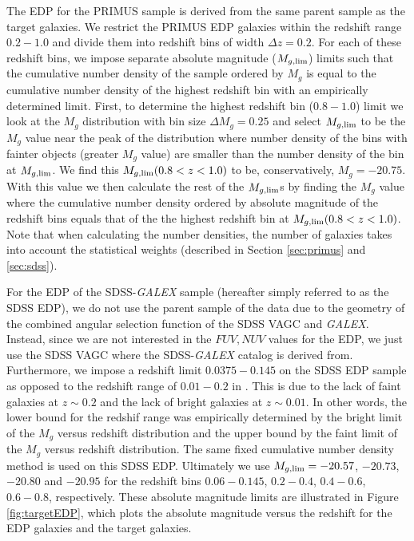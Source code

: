 \documentclass{emulateapj}
\begin{document}
The EDP for the PRIMUS sample is derived from the same parent sample as the target galaxies. 
We restrict the PRIMUS EDP galaxies within the redshift range $0.2-1.0$ and divide them into redshift bins of width $\Delta z = 0.2$. 
For each of these redshift bins, we impose separate absolute magnitude ($M_{g,\rm{lim}}$) limits such 
that the cumulative number density of the sample ordered by $M_{g}$ is equal to the cumulative 
number density of the highest redshift bin with an empirically determined limit. 
First, to determine the highest redshift bin ($0.8-1.0$) limit we look at the $M_{g}$ distribution with bin size
$\Delta M_{g} = 0.25$ and select $M_{g,\rm{lim}}$ to be the $M_{g}$ value near the peak of the 
distribution where number density of the bins with fainter objects (greater $M_{g}$ value) are smaller
than the number density of the bin at $M_{g, \rm{lim}}$. 
We find this $M_{g, \rm{lim}}( 0.8 < z < 1.0)$ to be, conservatively, $M_{g} = -20.75$. 
With this value we then calculate the rest of the $M_{g, \rm{lim}}$s by finding the
$M_{g}$ value where the cumulative number density ordered by absolute magnitude of the redshift bins 
equals that of the the highest redshift bin at $M_{g, \rm{lim}}( 0.8 < z < 1.0)$. 
Note that when calculating the number densities, the number of galaxies takes into account the 
statistical weights (described in Section \ref{sec:primus} and \ref{sec:sdss}).

For the EDP of the SDSS-{\em GALEX} sample (hereafter simply referred to as the SDSS EDP), 
we do not use the parent sample of the data due to 
the geometry of the combined angular selection function of the SDSS VAGC and {\em GALEX}. 
Instead, since we are not interested in the $FUV, NUV$ values for the EDP, we just use the
SDSS VAGC where the SDSS-{\em GALEX} catalog is derived from. 
Furthermore, we impose a redshift limit $0.0375-0.145$ on the SDSS EDP sample as opposed 
to the redshift range of $0.01-0.2$ in \cite{Moustakas:20133aa}.
This is due to the lack of faint galaxies at $z \sim 0.2$ and the lack of bright 
galaxies at $z \sim 0.01$. 
In other words, the lower bound for the redshif range was empirically determined by the bright limit of 
the $M_{g}$ versus redshift distribution and the upper bound by the faint limit of the 
$M_{g}$ versus redshift distribution. 
The same fixed cumulative number density method is used on this SDSS EDP. 
Ultimately we use $M_{g,\rm{lim}} = -20.57$, $-20.73$, $-20.80$ and $-20.95$ for the redshift bins 
$0.06-0.145$, $0.2-0.4$, $0.4-0.6$, $0.6-0.8$, respectively. 
These absolute magnitude limits are illustrated in Figure \ref{fig:targetEDP}, which plots the absolute magnitude versus the redshift for the EDP galaxies and the target galaxies. 
\end{document}
